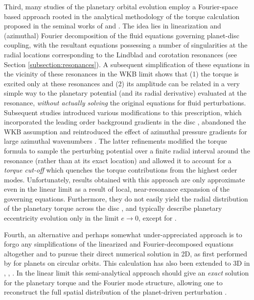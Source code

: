 Third, many studies of the planetary orbital evolution employ a Fourier-space based approach rooted in the analytical methodology of the torque calculation proposed in the seminal works of \citet{GoldreichTremaine_1979,GoldreichTremaine_1980} and \citet{Lin1979}. The idea lies in linearization and (azimuthal) Fourier decomposition of the fluid equations governing planet-disc coupling, with the resultant equations possessing a number of singularities at the radial locations corresponding to the Lindblad and corotation resonances (see Section \ref{subsection:resonances}). A subsequent simplification of these equations in the vicinity of these resonances in the WKB limit shows that (1) the torque is excited only at these resonances and (2) its amplitude can be related in a very simple way to the planetary potential (and its radial derivative) evaluated at the resonance, {\it without actually solving} the original equations for fluid perturbations. Subsequent studies introduced various modifications to this prescription, which incorporated the leading order background gradients in the disc \citep{Ward_1986,Ward_1988}, abandoned the WKB assumption and reintroduced the effect of azimuthal pressure gradients for large azimuthal wavenumbers \citep{Artymowicz_1993, Artymowicz1993b, Artymowicz_1994, Ward_1997}. The latter refinements modified the torque formula to sample the perturbing potential over a finite radial interval around the resonance (rather than at its exact location) and allowed it to account for a \textit{torque cut-off} \citep[first described in][]{GoldreichTremaine_1980} which quenches the torque contributions from the highest order modes. Unfortunately, results obtained with this approach are only approximate even in the linear limit as a result of local, near-resonance expansion of the governing equations. Furthermore, they do not easily yield the radial distribution of the planetary torque across the disc \citep[only its integrated value, cf.] []{RafikovPetrovich_2012}, and typically describe planetary eccentricity evolution only in the limit $e\to 0$, except for \citet{PapaloizouLarwood_2000}.

Fourth, an alternative and perhaps somewhat under-appreciated approach is to forgo any simplifications of the linearized and Fourier-decomposed equations altogether and to pursue their direct numerical solution in 2D, as first performed by \cite{KorycanskyPollack_1993} for planets on circular orbits. This calculation has also been extended to 3D in \citet{TanakaEtAl_2002}, \citet{TanakaWard_2004}, \citet{TanakaOkada_2024}. In the linear limit this semi-analytical approach should give an {\it exact} solution for the planetary torque \citep{RafikovPetrovich_2012,Petrovich2012} and the Fourier mode structure, allowing one to reconstruct the full spatial distribution of the planet-driven perturbation \citep{MirandaRafikov_2019a,MirandaRafikov_2020}.

